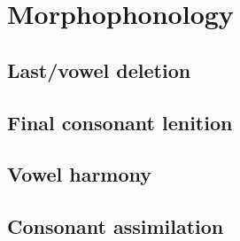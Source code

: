 \chapter{Morphophonology}

\section{Last\-/vowel deletion}

\section{Final consonant lenition}

\section{Vowel harmony}

\section{Consonant assimilation}